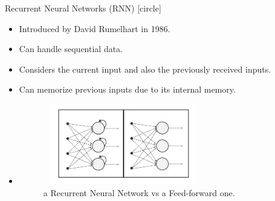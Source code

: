 \begin{frame}{Recurrent Neural Networks (RNN)}
    [circle]
    \begin{itemize}
        \item{Introduced by David Rumelhart in 1986.}
        \vspace{0.2cm}
        \item{Can handle sequential data.}
        \vspace{0.2cm}
        \item{Considers the current input and also the previously received inputs.}
        \vspace{0.2cm}
        \item{Can memorize previous inputs due to its internal memory.}
        \vspace{0.2cm}
        \item[]{
        \begin{figure}[H]
            \centering
            \includegraphics[width=7cm,height=3.5cm]{images/rnn-vs-fnn.png}
            \caption{a Recurrent Neural Network vs a Feed-forward one.}
            \label{fig:rnn-vs-fnn}
        \end{figure}
        }
    \end{itemize}
\end{frame}

